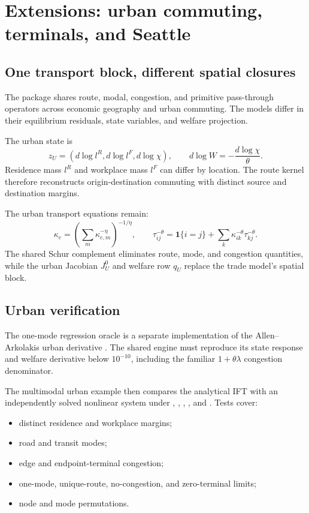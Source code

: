 \chapter{Extensions: urban commuting, terminals, and Seattle}
\label{ch:extensions}

\section{One transport block, different spatial closures}

The package shares route, modal, congestion, and primitive pass-through
operators across economic geography and urban commuting. The models differ in
their equilibrium residuals, state variables, and welfare projection.

The urban state is
\[
 z_U=(d\log l^R,d\log l^F,d\log\chi),
 \qquad
 d\log W=-\frac{d\log\chi}{\theta}.
\]
Residence mass \(l^R\) and workplace mass \(l^F\) can differ by location.
The route kernel therefore reconstructs origin-destination commuting with
distinct source and destination margins.

The urban transport equations remain:
\[
 \kappa_e=\left(\sum_m\kappa_{e,m}^{-\eta}\right)^{-1/\eta},
\qquad
 \tau_{ij}^{-\theta}
 =\mathbf 1\{i=j\}+\sum_k\kappa_{ik}^{-\theta}\tau_{kj}^{-\theta}.
\]
The shared Schur complement eliminates route, mode, and congestion quantities,
while the urban Jacobian \(J_U^0\) and welfare row \(q_U\) replace the trade
model's spatial block.

\section{Urban verification}

The one-mode regression oracle is a separate implementation of the
Allen--Arkolakis urban derivative \citep{AA_2022restud}. The shared engine must
reproduce its state response and welfare derivative below \(10^{-10}\),
including the familiar \(1+\theta\lambda\) congestion denominator.

The multimodal urban example then compares the analytical IFT with an
independently solved nonlinear system under , , ,
, and . Tests cover:
\begin{itemize}
  \item distinct residence and workplace margins;
  \item road and transit modes;
  \item edge and endpoint-terminal congestion;
  \item one-mode, unique-route, no-congestion, and zero-terminal limits;
  \item node and mode permutations.
\end{itemize}

